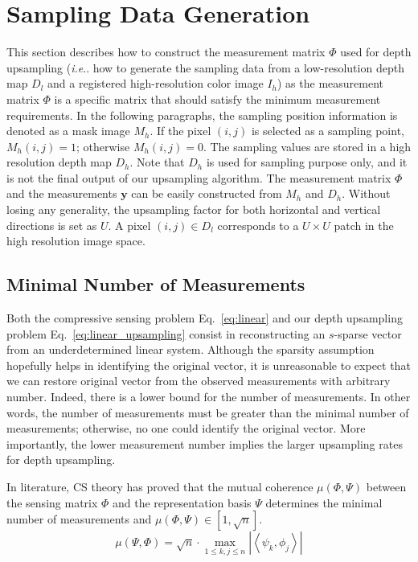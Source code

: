 \documentclass[preprint,10pt,5p,times,twocolumn]{elsarticle}
\makeatletter
\DeclareRobustCommand\onedot{\futurelet\@let@token\@onedot}
\def\@onedot{\ifx\@let@token.\else.\null\fi\xspace}
\def\ie{\emph{i.e}\onedot} \def\Ie{\emph{I.e}\onedot}
\makeatother
\begin{document}
\section{Sampling Data Generation}
\label{chap:samplingdata}

This section describes how to construct the measurement matrix $\Phi$ used for depth upsampling (\ie how to generate the sampling data from a low-resolution depth map $D_{l}$ and a registered high-resolution color image $I_{h}$) as the measurement matrix $\Phi$ is a specific matrix that should satisfy the minimum measurement requirements. In the following paragraphs, the sampling position information is denoted as a mask image $M_{h}$. If the pixel $(i,j)$ is selected as a sampling point, $M_{h}(i,j)=1$; otherwise $M_{h}(i,j)=0$. The sampling values are stored in a high resolution depth map $D_{h}$. Note that $D_{h}$ is used for sampling purpose only, and it is not the final output of our upsampling algorithm. The measurement matrix $\Phi$ and the measurements $\mathbf{y}$ can be easily constructed from $M_{h}$ and $D_{h}$. Without losing any generality, the upsampling factor for both horizontal and vertical directions is set as $U$. A pixel $(i,j)\in D_{l}$ corresponds to a $U\times U$ patch in the high resolution image space.

\subsection{Minimal Number of Measurements}
\label{chap:measurements}

Both the compressive sensing problem Eq.~\eqref{eq:linear} and our depth upsampling problem Eq.~\eqref{eq:linear_upsampling} consist in reconstructing an $s$-sparse vector from an underdetermined linear system. Although the sparsity assumption hopefully helps
in identifying the original vector, it is unreasonable to expect that we can restore original vector from the observed measurements with arbitrary number. Indeed, there is a lower bound for the number of measurements. In other words, the number of measurements must be greater than the minimal number of measurements; otherwise, no one could identify the original vector. More importantly, the lower measurement number implies the larger upsampling rates for depth upsampling.

In literature, CS theory has proved that the mutual coherence $\mu(\Phi, \Psi)$ between the sensing matrix $\Phi$ and the representation basis $\Psi$ determines the minimal number of measurements and $\mu(\Phi, \Psi) \in [1, \sqrt{n}]$.
%
\begin{equation}
\mu(\Psi, \Phi) = \sqrt{n} \cdot \max_{1 \leq k, j \leq n} \left |  \left \langle  \psi_k, \phi_j \right \rangle \right|
\end{equation}
%
\end{document}
